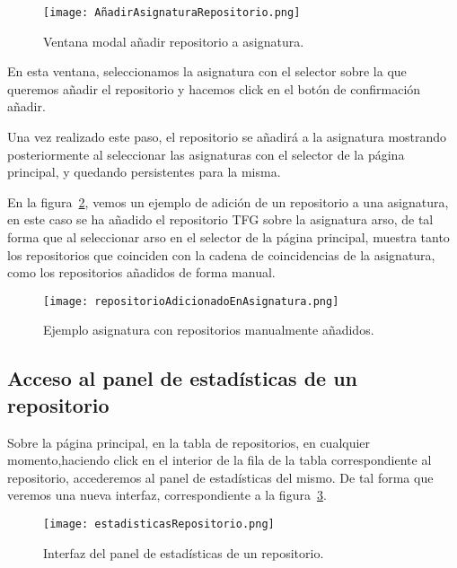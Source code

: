     \begin{figure}[h!]
      \texttt{[image: AñadirAsignaturaRepositorio.png]}
      \caption{Ventana modal añadir repositorio a asignatura.}
      \label{figure:repoAAsignatura}
    \end{figure}

    En esta ventana, seleccionamos la asignatura con el selector sobre la que queremos añadir el repositorio y hacemos click en el botón de confirmación añadir. 

    Una vez realizado este paso, el repositorio se añadirá a la asignatura mostrando posteriormente al seleccionar las asignaturas con el selector de la página principal, y quedando persistentes para la misma.

    En la figura~\ref{figure:asignaturaConReposManuales}, vemos un ejemplo de adición de un repositorio a una asignatura, en este caso se ha añadido el repositorio TFG sobre la asignatura arso, de tal forma que al seleccionar arso en el selector de la página principal, muestra tanto los repositorios que coinciden con la cadena de coincidencias de la asignatura, como los repositorios añadidos de forma manual.

    \begin{figure}[h!]
      \texttt{[image: repositorioAdicionadoEnAsignatura.png]}
      \caption{Ejemplo asignatura con repositorios manualmente añadidos.}
      \label{figure:asignaturaConReposManuales}
    \end{figure}

\subsection{Acceso al panel de estadísticas de un repositorio}

    Sobre la página principal, en la tabla de repositorios, en cualquier momento,haciendo click en el interior de la fila de la tabla correspondiente al repositorio, accederemos al panel de estadísticas del mismo. De tal forma que veremos una nueva interfaz, correspondiente a la figura~\ref{figure:estadRepo}.

    \begin{figure}[h!]
      \texttt{[image: estadisticasRepositorio.png]}
      \caption{Interfaz del panel de estadísticas de un repositorio.}
      \label{figure:estadRepo}
    \end{figure}


